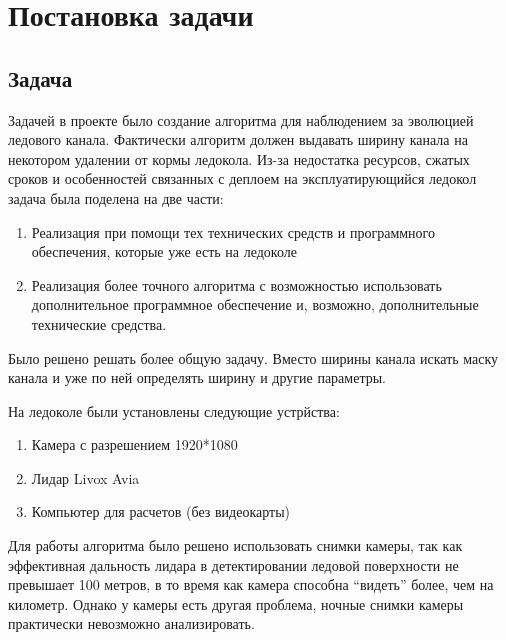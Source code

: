 \section{Постановка задачи}
\subsection{Задача}
Задачей в проекте было создание алгоритма для наблюдением за эволюцией ледового канала. Фактически алгоритм должен выдавать ширину канала на 
некотором удалении от кормы ледокола. Из-за недостатка ресурсов, сжатых сроков и особенностей связанных с деплоем на эксплуатирующийся ледокол задача была поделена на две части:
\begin{enumerate}
    \item Реализация при помощи тех технических средств и программного обеспечения, которые уже есть на ледоколе
    \item Реализация более точного алгоритма с возможностью использовать дополнительное программное обеспечение и, возможно, дополнительные технические средства.
\end{enumerate}

Было решено решать более общую задачу. Вместо ширины канала искать маску канала и уже по ней определять ширину и другие параметры.

На ледоколе были установлены следующие устрйства:
\begin{enumerate}
    \item Камера с разрешением 1920*1080
    \item Лидар Livox Avia
    \item Компьютер для расчетов (без видеокарты) 
\end{enumerate}

Для работы алгоритма было решено использовать снимки камеры, так как эффективная дальность лидара в детектировании ледовой поверхности не превышает 100 метров, 
в то время как камера способна ``видеть'' более, чем на километр. Однако у камеры есть другая проблема, ночные снимки камеры практически невозможно анализировать.

